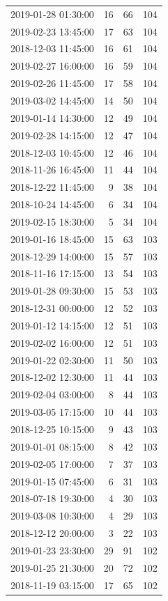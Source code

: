 \begin{tabular}{lrrr}
2019-01-28 01:30:00 & 16 & 66 & 104 \\
2019-02-23 13:45:00 & 17 & 63 & 104 \\
2018-12-03 11:45:00 & 16 & 61 & 104 \\
2019-02-27 16:00:00 & 16 & 59 & 104 \\
2019-02-26 11:45:00 & 17 & 58 & 104 \\
2019-03-02 14:45:00 & 14 & 50 & 104 \\
2019-01-14 14:30:00 & 12 & 49 & 104 \\
2019-02-28 14:15:00 & 12 & 47 & 104 \\
2018-12-03 10:45:00 & 12 & 46 & 104 \\
2018-11-26 16:45:00 & 11 & 44 & 104 \\
2018-12-22 11:45:00 & 9 & 38 & 104 \\
2018-10-24 14:45:00 & 6 & 34 & 104 \\
2019-02-15 18:30:00 & 5 & 34 & 104 \\
2019-01-16 18:45:00 & 15 & 63 & 103 \\
2018-12-29 14:00:00 & 15 & 57 & 103 \\
2018-11-16 17:15:00 & 13 & 54 & 103 \\
2019-01-28 09:30:00 & 15 & 53 & 103 \\
2018-12-31 00:00:00 & 12 & 52 & 103 \\
2019-01-12 14:15:00 & 12 & 51 & 103 \\
2019-02-02 16:00:00 & 12 & 51 & 103 \\
2019-01-22 02:30:00 & 11 & 50 & 103 \\
2018-12-02 12:30:00 & 11 & 44 & 103 \\
2019-02-04 03:00:00 & 8 & 44 & 103 \\
2019-03-05 17:15:00 & 10 & 44 & 103 \\
2018-12-25 10:15:00 & 9 & 43 & 103 \\
2019-01-01 08:15:00 & 8 & 42 & 103 \\
2019-02-05 17:00:00 & 7 & 37 & 103 \\
2019-01-15 07:45:00 & 6 & 31 & 103 \\
2018-07-18 19:30:00 & 4 & 30 & 103 \\
2019-03-08 10:30:00 & 4 & 29 & 103 \\
2018-12-12 20:00:00 & 3 & 22 & 103 \\
2019-01-23 23:30:00 & 29 & 91 & 102 \\
2019-01-25 21:30:00 & 20 & 72 & 102 \\
2018-11-19 03:15:00 & 17 & 65 & 102 \\

\end{tabular}
